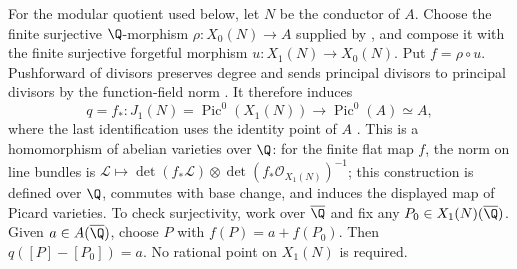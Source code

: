For the modular quotient used below, let $N$ be the conductor of $A$.
Choose the finite surjective $\Q$-morphism
$\rho:X_0(N)\to A$ supplied by
\cite[Theorem C.13.6]{silverman}, and compose it with the finite
surjective forgetful morphism $u:X_1(N)\to X_0(N)$.
Put $f=\rho\circ u$. Pushforward of divisors preserves degree
and sends principal divisors to principal divisors by the function-field
norm \cite[Proposition II.3.6(c),(d)]{silverman}.
It therefore induces
\[
 q=f_*:J_1(N)=\operatorname{Pic}^0(X_1(N))
       \longrightarrow\operatorname{Pic}^0(A)\simeq A,
\]
where the last identification uses the identity point of $A$
\cite[Proposition III.3.4]{silverman}.
This is a homomorphism of abelian varieties over $\Q$: for the finite
flat map $f$, the norm on line bundles is
$\mathcal L\mapsto\det(f_*\mathcal L)\otimes
\det(f_*\mathcal O_{X_1(N)})^{-1}$;
this construction is defined over $\Q$, commutes with base change,
and induces the displayed map of Picard varieties.
To check surjectivity, work over $\overline{\Q}$ and fix any
$P_0\in X_1(N)(\overline{\Q})$. Given $a\in A(\overline{\Q})$,
choose $P$ with $f(P)=a+f(P_0)$. Then
$q([P]-[P_0])=a$. No rational point on $X_1(N)$ is required.
